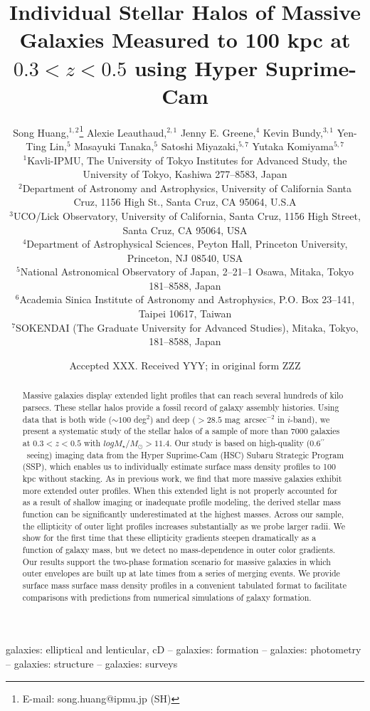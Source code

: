 \documentclass[a4paper,fleqn,usenatbib]{mnras}
\title[Mass Dependent Stellar Halos in Massive Galaxies]{Individual Stellar Halos of 
	   Massive Galaxies Measured to 100 kpc at $0.3<z<0.5$ using Hyper Suprime-Cam}
\author[S. Huang et al.]{
        Song Huang,$^{1,2}$\thanks{E-mail: song.huang@ipmu.jp (SH)}
        Alexie Leauthaud,$^{2,1}$
        Jenny E. Greene,$^{4}$
        Kevin Bundy,$^{3,1}$
        \newauthor
        Yen-Ting Lin,$^{5}$
        Masayuki Tanaka,$^{5}$
        Satoshi Miyazaki,$^{5,7}$
        \newauthor
        Yutaka Komiyama$^{5,7}$
        \\
        $^{1}$Kavli-IPMU, The University of Tokyo Institutes for Advanced Study, 
              the University of Tokyo, Kashiwa 277--8583, Japan\\
        $^{2}$Department of Astronomy and Astrophysics, University of California 
              Santa Cruz, 1156 High St., Santa Cruz, CA 95064, U.S.A\\
        $^{3}$UCO/Lick Observatory, University of California, Santa Cruz,
              1156 High Street, Santa Cruz, CA 95064, USA\\
        $^{4}$Department of Astrophysical Sciences, Peyton Hall,
              Princeton University, Princeton, NJ 08540, USA \\
        $^{5}$National Astronomical Observatory of Japan, 2--21--1 Osawa, Mitaka, 
              Tokyo 181--8588, Japan\\
        $^{6}$Academia Sinica Institute of Astronomy and Astrophysics, 
              P.O. Box 23--141, Taipei 10617, Taiwan\\
        $^{7}$SOKENDAI (The Graduate University for Advanced Studies), Mitaka,
              Tokyo, 181--8588, Japan
        }
\date{Accepted XXX. Received YYY; in original form ZZZ}
\def\asec{$^{\prime\prime}$}
\def\sb{mag~arcsec$^{-2}$}
\begin{document}
\label{firstpage}
\pagerange{\pageref{firstpage}--\pageref{lastpage}}

\maketitle


\begin{abstract} 

    Massive galaxies display extended light profiles that can reach several 
    hundreds of kilo parsecs. 
    These stellar halos provide a fossil record of galaxy assembly histories. 
    Using data that is both wide (${\sim}100$ deg$^2$) and deep ($>28.5$ \sb{} in 
    $i$-band), we present a systematic study of the stellar halos of a sample of more 
    than $7000$ galaxies at $0.3 < z < 0.5$ with $log M_{\star}/M_{\odot} > 11.4$. 
    Our study is based on high-quality (0.6\asec\ seeing) imaging data from the Hyper 
    Suprime-Cam (HSC) Subaru Strategic Program (SSP), which enables us to individually 
    estimate surface mass density profiles to 100 kpc without stacking. 
    As in previous work, we find that more massive galaxies exhibit more extended outer 
    profiles.  
    When this extended light is not properly accounted for as a result of shallow imaging 
    or inadequate profile modeling, the derived stellar mass function can be 
    significantly underestimated at the highest masses.  
    Across our sample, the ellipticity of outer light profiles increases substantially 
    as we probe larger radii.  
    We show for the first time that these ellipticity gradients steepen dramatically as 
    a function of galaxy mass, but we detect no mass-dependence in outer color gradients. 
    Our results support the two-phase formation scenario for massive galaxies in which 
    outer envelopes are built up at late times from a series of merging events. 
    We provide surface mass surface mass density profiles in a convenient tabulated format 
    to facilitate comparisons with predictions from numerical simulations of 
    galaxy formation.
    
\end{abstract}

\begin{keywords}
    galaxies: elliptical and lenticular, cD --
    galaxies: formation --
    galaxies: photometry -- 
    galaxies: structure -- 
    galaxies: surveys
\end{keywords}
\end{document}

